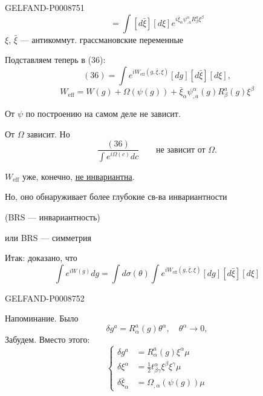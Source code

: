 \begin{GelfandAdjacentEvidence}{GELFAND-P000875}{1}
\[
=\int[d\bar\xi][d\xi]e^{i\bar\xi_\alpha\psi^\alpha_{,a}R_\beta^a\xi^\beta}
\]
$\xi$, $\bar\xi$ --- антикоммут. грассмановские переменные

Подставляем теперь в (36):
\begin{equation*}
(36)=\int e^{iW_{\mathrm{eff}}(g,\bar\xi,\xi)}[dg][d\bar\xi][d\xi],
\tag{38}
\end{equation*}
\begin{equation*}
W_{\mathrm{eff}}=W(g)+\Omega(\psi(g))+\bar\xi_\alpha\psi^\alpha_{,a}(g)R_\beta^a(g)\xi^\beta
\tag{39}
\end{equation*}

От $\psi$ по построению на самом деле не зависит.

От $\Omega$ зависит. Но
\begin{equation*}
\frac{(36)}{\int e^{i\Omega(c)}dc}\qquad\text{не зависит от $\Omega$.}
\tag{40}
\end{equation*}

$W_{\mathrm{eff}}$ уже, конечно, \uline{не инвариантна}.

Но, оно обнаруживает более глубокие св-ва инвариантности

(BRS --- инвариантность)

или BRS --- симметрия

Итак: доказано, что
\begin{equation*}
\int e^{iW(g)}dg=\int d\sigma(\theta)\int e^{iW_{\mathrm{eff}}(g,\bar\xi,\xi)}[dg][d\bar\xi][d\xi]
\tag{41}
\end{equation*}
\end{GelfandAdjacentEvidence}
\begin{GelfandAdjacentEvidence}{GELFAND-P000875}{2}


Напоминание. Было
\begin{equation*}
\delta g^a=R_\alpha^a(g)\theta^\alpha,\quad\theta^\alpha\to0,
\tag{42}
\end{equation*}
Забудем. Вместо этого:
\begin{equation*}
\left\{\begin{aligned}
\delta g^a &= R_\alpha^a(g)\xi^\alpha\mu\\
\delta\xi^\alpha &= \tfrac12 t^\alpha_{\beta\gamma}\xi^\beta\xi^\gamma\mu\\
\delta\bar\xi_\alpha &= \Omega_{,\alpha}(\psi(g))\mu
\end{aligned}\right.
\tag{43}
\end{equation*}
\end{GelfandAdjacentEvidence}
